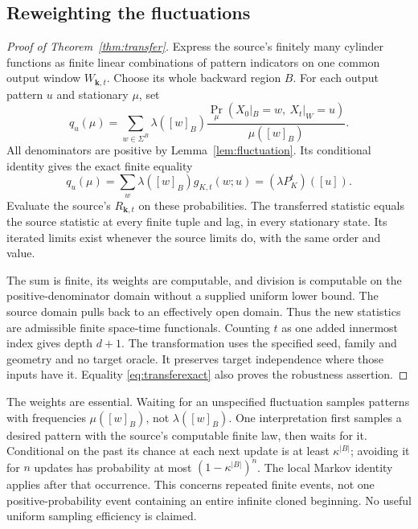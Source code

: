 \subsection{Reweighting the fluctuations}
\begin{proof}[Proof of Theorem~\ref{thm:transfer}]
Express the source's finitely many cylinder functions as finite
linear combinations of pattern indicators on one common output
window $W_{\mathbf k,t}$. Choose its whole backward region $B$.
For each output pattern $u$ and stationary $\mu$, set
\begin{equation}\label{eq:reweight}
 q_u(\mu)=
 \sum_{w\in\Sigma^B}\lambda([w]_B)
 \frac{\Pr_\mu(X_0|_B=w,\ X_t|_W=u)}{\mu([w]_B)}.
\end{equation}
All denominators are positive by Lemma~\ref{lem:fluctuation}.
Its conditional identity gives the exact finite equality
\begin{equation}\label{eq:transferexact}
 q_u(\mu)=\sum_w\lambda([w]_B)g_{K,t}(w;u)
                         =(\lambda P_K^t)([u]).
\end{equation}
Evaluate the source's $R_{\mathbf k,t}$ on these probabilities.
The transferred statistic equals the source statistic at every
finite tuple and lag, in every stationary state. Its iterated
limits exist whenever the source limits do, with the same order
and value.

The sum is finite, its weights are computable, and division is
computable on the positive-denominator domain without a supplied
uniform lower bound. The source domain pulls back to an effectively
open domain. Thus the new statistics are admissible finite
space-time functionals. Counting $t$ as one added innermost
index gives depth $d+1$. The transformation uses the specified
seed, family and geometry and no target oracle. It preserves
target independence where those inputs have it. Equality
\eqref{eq:transferexact} also proves the robustness assertion.
\end{proof}

The weights are essential. Waiting for an unspecified fluctuation
samples patterns with frequencies $\mu([w]_B)$, not
$\lambda([w]_B)$. One interpretation first samples a desired
pattern with the source's computable finite law, then waits for
it. Conditional on the past its chance at each next update is
at least $\kappa^{|B|}$; avoiding it for $n$ updates has probability
at most $(1-\kappa^{|B|})^n$. The local Markov identity applies
after that occurrence. This concerns repeated finite events,
not one positive-probability event containing an entire infinite
cloned beginning. No useful uniform sampling efficiency is claimed.

